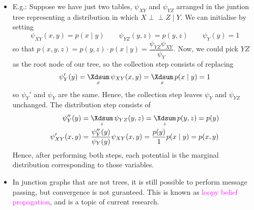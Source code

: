 \documentclass[UTF8]{book}
\DeclareMathOperator*{\Xsum}{\mathchoice{\Xdsum}{\Xtsum}{\Xtsum}{\Xtsum}}
\newcommand{\perpp}{\ensuremath{\perp\!\!\!\!\!\perp}}
\newcommand{\et}{&}
\newcommand{\concept}[1]{\textcolor{magenta}{#1}}
\begin{document}
\begin{itemize}
\item E.g.: Suppose we have just two tables, $\psi_{XY}$ and $\psi_{YZ}$ arranged in the juntion tree representing a distribution in which $X\perpp Z\mid Y$. We can initialise by setting
$$
\psi_{XY}(x,y) = p(x\mid y) \qquad \psi_{YZ}(y,z) = p(y, z) \qquad \psi_Y(y) = 1
$$
so that $p(x,y,z) = p(y,z)\cdot p(x\mid y)=\dfrac{\psi_{YZ}\psi_{XY}}{\psi_Y}$. Now, we could pick $YZ$ as the root node of our tree, so the collection step consists of replacing 
$$
\psi_Y'(y) = \Xsum_x\psi_{XY}(x,y) = \Xsum_xp(x\mid y) = 1
$$
so $\psi_Y'$ and $\psi_Y$ are the same. Hence, the collection step leaves $\psi_Y$ and $\psi_{YZ}$ unchanged. The distribution step consists of 
\begin{align*}
	\psi_Y''(y) \et = \Xsum_z\psi_{YZ}(y,z) = \Xsum_zp(y,z) = p(y)\\
	\psi_{XY}'(x,y) \et = \dfrac{\psi_Y''(y)}{\psi_Y(y)}\psi_{XY}(x,y) = \dfrac{p(y)}{1}p(x\mid y) = p(x,y)
\end{align*}
Hence, after performing both steps, each potential is the marginal distribution corresponding to those variables.
\item In junction graphs that are not trees, it is still possible to perform message passing, but convergence is not guranteed. This is known as \concept{loopy belief propagation}, and is a topic of current research.
\end{itemize}
\end{document}
